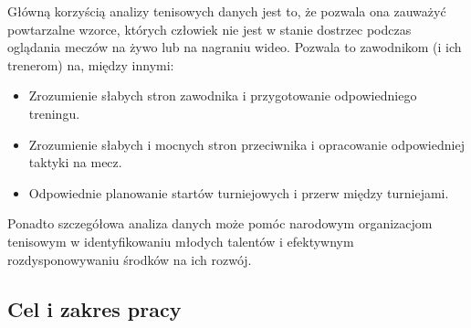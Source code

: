 \documentclass[12pt, a4paper]{article}
\begin{document}
Główną korzyścią analizy tenisowych danych jest to, że pozwala ona zauważyć powtarzalne wzorce, których człowiek nie jest w stanie dostrzec podczas oglądania meczów na żywo lub na nagraniu wideo. Pozwala to zawodnikom (i ich trenerom) na, między innymi:
\begin{itemize}
    \item Zrozumienie słabych stron zawodnika i przygotowanie odpowiedniego treningu.
    \item Zrozumienie słabych i mocnych stron przeciwnika i opracowanie odpowiedniej taktyki na mecz.
    \item Odpowiednie planowanie startów turniejowych i przerw między turniejami.
\end{itemize}
Ponadto szczegółowa analiza danych może pomóc narodowym organizacjom tenisowym w identyfikowaniu młodych talentów i efektywnym rozdysponowywaniu środków na ich rozwój.

\subsection{Cel i zakres pracy}








\end{document}

